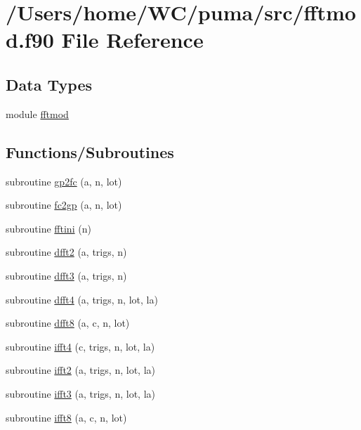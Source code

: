 \hypertarget{fftmod_8f90}{
\section{/\-Users/home/\-W\-C/puma/src/fftmod.f90 \-File \-Reference}
\label{fftmod_8f90}
}
\subsection*{\-Data \-Types}
\begin{DoxyCompactItemize}
\item 
module \hyperlink{classfftmod}{fftmod}
\end{DoxyCompactItemize}
\subsection*{\-Functions/\-Subroutines}
\begin{DoxyCompactItemize}
\item 
subroutine \hyperlink{fftmod_8f90_a8b611c69cc0d4f2c29a543e7903cb495}{gp2fc} (a, n, lot)
\item 
subroutine \hyperlink{fftmod_8f90_aa0cf4000171aaaf40d5e9850f73703db}{fc2gp} (a, n, lot)
\item 
subroutine \hyperlink{fftmod_8f90_a8263c4f24b36fe62f88ab2fb4e1d2152}{fftini} (n)
\item 
subroutine \hyperlink{fftmod_8f90_a6d2dbc83ff732343036d20cc9625cb98}{dfft2} (a, trigs, n)
\item 
subroutine \hyperlink{fftmod_8f90_a1d7e74baca7896477fb2e32b73ccab37}{dfft3} (a, trigs, n)
\item 
subroutine \hyperlink{fftmod_8f90_a016c6910afcaeee463180fcc1d24297a}{dfft4} (a, trigs, n, lot, la)
\item 
subroutine \hyperlink{fftmod_8f90_ad824fc1d5775104962b9b77142e909a3}{dfft8} (a, c, n, lot)
\item 
subroutine \hyperlink{fftmod_8f90_aa4540793d1039abfdcc4512f4aacc8a0}{ifft4} (c, trigs, n, lot, la)
\item 
subroutine \hyperlink{fftmod_8f90_a5f8dd5758a7e842f97b8492e7633a1b8}{ifft2} (a, trigs, n, lot, la)
\item 
subroutine \hyperlink{fftmod_8f90_a43856abf5ad7775f9454dd090e74e444}{ifft3} (a, trigs, n, lot, la)
\item 
subroutine \hyperlink{fftmod_8f90_a4c6991cf5c64fa6c35c4d42ff48a3574}{ifft8} (a, c, n, lot)
\end{DoxyCompactItemize}


